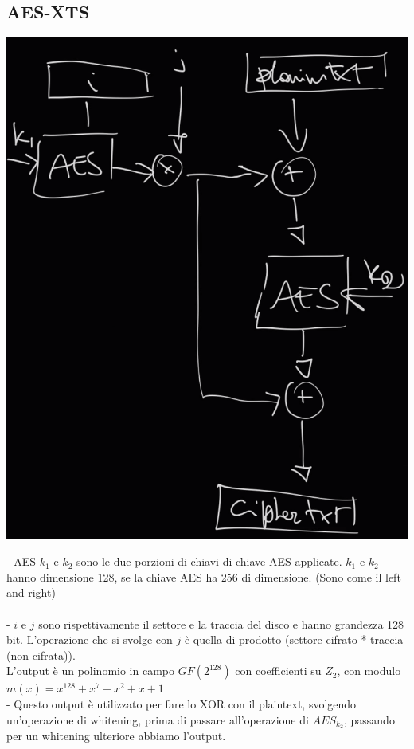 \documentclass[11pt, oneside]{article}   	%
\begin{document}
\subsection*{AES-XTS}
\begin{center}
\includegraphics[scale= 0.4]{aesxts}\\
\end{center}
- AES $k_1$ e $k_2$ sono le due porzioni di chiavi di chiave AES applicate. $k_1$ e $k_2$ hanno dimensione 128, se la chiave AES ha 256 di dimensione. (Sono come il left and right)\\\\
- $i$ e $j$ sono rispettivamente il settore e la traccia del disco e hanno grandezza 128 bit. L'operazione che si svolge con $j$ è quella di prodotto (settore cifrato * traccia (non cifrata)). \\L'output è un polinomio in campo $GF(2^{128})$ con coefficienti su $Z_2$, con modulo $m(x) = x^{128}+x^7+x^2+x+1$\\
- Questo output è utilizzato per fare lo XOR con il plaintext, svolgendo un'operazione di whitening, prima di passare all'operazione di $AES_{k_2}$, passando per un whitening ulteriore abbiamo l'output.\\\\
\end{document}
